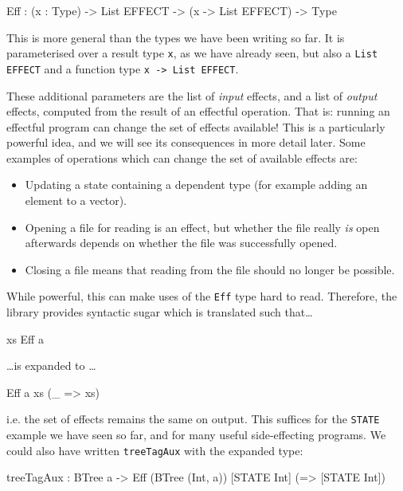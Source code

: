 \begin{code}
Eff : (x : Type) ->
      List EFFECT -> (x -> List EFFECT) -> Type
\end{code}

\noindent
This is more general than the types we have been writing so far. It is
parameterised over a result type \texttt{x},
as we have already seen, but also a \texttt{List EFFECT} and a function type
\texttt{x -> List EFFECT}.

These additional parameters are the list of \emph{input} effects, and a list
of \emph{output} effects, computed from the result of an effectful operation.
That is: running an effectful program can change the set of effects available!
This is a particularly powerful idea, and we will see its consequences in more
detail later. Some examples of operations which can change the set of available
effects are:

\begin{itemize}
\item Updating a state containing a dependent type (for example adding an
element to a vector).
\item Opening a file for reading is an effect, but whether the file really
\emph{is} open afterwards depends on whether the file was successfully opened.
\item Closing a file means that reading from the file should no longer be
possible.
\end{itemize}

\noindent
While powerful, this can make uses of the \texttt{Eff} type hard to read.
Therefore, the \effects{} library provides syntactic sugar which is translated
such that\ldots

\begin{code}
{ xs } Eff a
\end{code}

\ldots is expanded to \ldots

\begin{code}
Eff a xs (\_ => xs)
\end{code}

\noindent
i.e. the set of effects remains the same on output. This suffices for the
\texttt{STATE} example we have seen so far, and for many useful side-effecting
programs. We could also have written \texttt{treeTagAux} with the expanded
type:

\begin{code}
treeTagAux : BTree a ->
             Eff (BTree (Int, a)) [STATE Int] (\x => [STATE Int])
\end{code}

